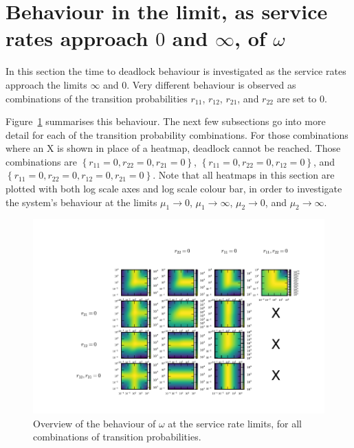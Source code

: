 \documentclass{article}
\begin{document}
\section{Behaviour in the limit, as service rates approach $0$ and $\infty$, of $\omega$}

In this section the time to deadlock behaviour is investigated as the service rates approach the limits $\infty$ and $0$.
Very different behaviour is observed as combinations of the transition probabilities $r_{11}$, $r_{12}$, $r_{21}$, and $r_{22}$ are set to $0$.

Figure~\ref{fig:all_combinations_mus_limits} summarises this behaviour. The next few subsections go into more detail for each of the transition probability combinations. For those combinations where an X is shown in place of a heatmap, deadlock cannot be reached. Those combinations are $\left\{ r_{11} = 0, r_{22} = 0, r_{21} = 0 \right\}$, $\left\{ r_{11} = 0, r_{22} = 0, r_{12} = 0 \right\}$, and $\left\{ r_{11} = 0, r_{22} = 0, r_{12} = 0, r_{21} = 0 \right\}$. Note that all heatmaps in this section are plotted with both log scale axes and log scale colour bar, in order to investigate the system's behaviour at the limits $\mu_1 \to 0$, $\mu_1 \to \infty$, $\mu_2 \to 0$, and $\mu_2 \to \infty$.

\begin{figure}[htbp!]
\begin{center}
	\includegraphics[width=\textwidth]{images/muslimit_allcombinations.pdf}
	\caption{Overview of the behaviour of $\omega$ at the service rate limits, for all combinations of transition probabilities.}
	\label{fig:all_combinations_mus_limits}
\end{center}
\end{figure}
\end{document}
